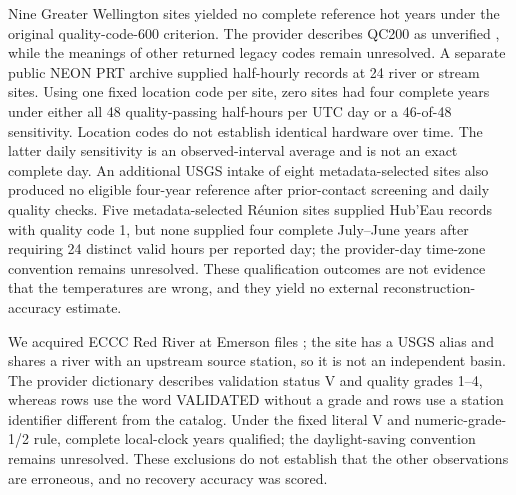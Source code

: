 \documentclass[draft,linenumbers]{agujournal2025}
\begin{document}
Nine Greater Wellington sites yielded no complete reference hot years under the original quality-code-600 criterion. The provider describes QC200 as unverified \cite{greaterwellington2016quality}, while the meanings of other returned legacy codes remain unresolved. A separate public NEON PRT archive \cite{marzolf2025neon} supplied half-hourly records at 24 river or stream sites. Using one fixed location code per site, zero sites had four complete years under either all 48 quality-passing half-hours per UTC day or a 46-of-48 sensitivity. Location codes do not establish identical hardware over time. The latter daily sensitivity is an observed-interval average and is not an exact complete day. An additional USGS intake of eight metadata-selected sites also produced no eligible four-year reference after prior-contact screening and daily quality checks. Five metadata-selected R\'eunion sites supplied Hub'Eau records \cite{hubeautemp2026} with quality code 1, but none supplied four complete July--June years after requiring 24 distinct valid hours per reported day; the provider-day time-zone convention remains unresolved. These qualification outcomes are not evidence that the temperatures are wrong, and they yield no external reconstruction-accuracy estimate.

We acquired \ECCCFiles{} ECCC Red River at Emerson files \cite{ecccautomated2024}; the site has a USGS alias \cite{usgsred2025} and shares a river with an upstream source station, so it is not an independent basin. The provider dictionary describes validation status V and quality grades 1--4, whereas \ECCCValidatedMissingGrade{} rows use the word VALIDATED without a grade and \ECCCUnresolvedIdentity{} rows use a station identifier different from the catalog. Under the fixed literal V and numeric-grade-1/2 rule, \ECCCCompleteYears{} complete local-clock years qualified; the daylight-saving convention remains unresolved. These exclusions do not establish that the other observations are erroneous, and no recovery accuracy was scored.
\end{document}
